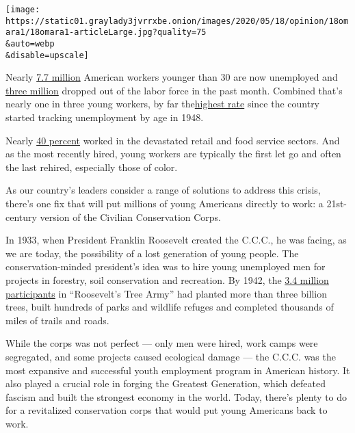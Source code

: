 \texttt{[image: https://static01.graylady3jvrrxbe.onion/images/2020/05/18/opinion/18omara1/18omara1-articleLarge.jpg?quality=75\\\&auto=webp\\\&disable=upscale]}

Nearly
\href{https://int.graylady3jvrrxbe.onion/data/documenthelper/6953-unemployment-under-30/8b646ef429cecb7d77a7/optimized/full.pdf\#page=1}{7.7
million} American workers younger than 30 are now unemployed and
\href{https://int.graylady3jvrrxbe.onion/data/documenthelper/6954-3-million-left-workforce/8b646ef429cecb7d77a7/optimized/full.pdf\#page=1}{three
million} dropped out of the labor force in the past month. Combined
that's nearly one in three young workers, by far
the\href{https://int.graylady3jvrrxbe.onion/data/documenthelper/6955-highestunemplyment/d1c48c3099970861ff19/optimized/full.pdf\#page=1}{highest
rate} since the country started tracking unemployment by age in 1948.

Nearly \href{https://www.bls.gov/news.release/empsit.nr0.htm}{40
percent} worked in the devastated retail and food service sectors. And
as the most recently hired, young workers are typically the first let go
and often the last rehired, especially those of color.

As our country's leaders consider a range of solutions to address this
crisis, there's one fix that will put millions of young Americans
directly to work: a 21st-century version of the Civilian Conservation
Corps.

In 1933, when President Franklin Roosevelt created the C.C.C., he was
facing, as we are today, the possibility of a lost generation of young
people. The conservation-minded president's idea was to hire young
unemployed men for projects in forestry, soil conservation and
recreation. By 1942, the
\href{http://archiveswest.orbiscascade.org/ark:/80444/xv31307}{3.4
million participants} in ``Roosevelt's Tree Army'' had planted more than
three billion trees, built hundreds of parks and wildlife refuges and
completed thousands of miles of trails and roads.

While the corps was not perfect --- only men were hired, work camps were
segregated, and some projects caused ecological damage --- the C.C.C.
was the most expansive and successful youth employment program in
American history. It also played a crucial role in forging the Greatest
Generation, which defeated fascism and built the strongest economy in
the world. Today, there's plenty to do for a revitalized conservation
corps that would put young Americans back to work.

